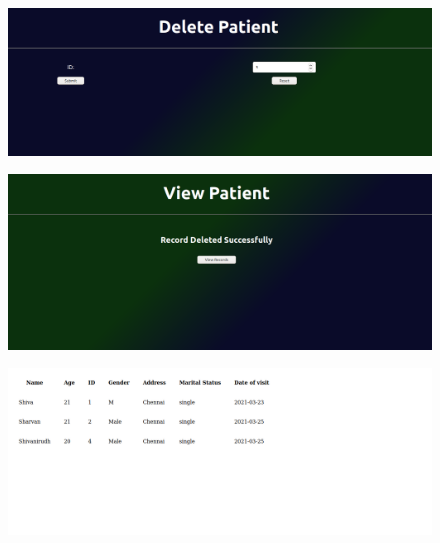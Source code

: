\documentclass[12pt,letterpaper]{article}
\begin{document}
\subsubsection*{}
\begin{figure}[h]
    \centering
    \includegraphics[width = \textwidth]{Pics/delete1.png}
\end{figure}
\begin{figure}[h!]
    \centering
    \includegraphics[width = \textwidth]{Pics/delete2.png}
\end{figure}
\begin{figure}[h!]
    \centering
    \includegraphics[width = \textwidth]{Pics/delete3.png}
\end{figure}
\newpage
\end{document}
